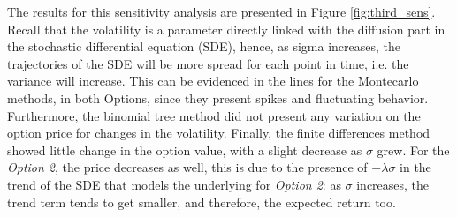 \documentclass[11pt]{article}
\theoremstyle{definition}
\theoremstyle{remark}
\theoremstyle{remark}
\begin{document}
The results for this sensitivity analysis are presented in Figure
\ref{fig:third_sens}. Recall that the volatility is a parameter directly linked
with the diffusion part in the stochastic differential equation (SDE), hence, as
sigma increases, the trajectories of the SDE will be more spread for each point
in time, i.e. the variance will increase. This can be evidenced in the lines for
the Montecarlo methods, in both Options, since they present spikes and
fluctuating behavior. Furthermore, the binomial tree method did not present any
variation on the option price for changes in the volatility. Finally, the finite
differences method showed little change in the option value, with a slight
decrease as $\sigma$ grew. For the \textit{Option 2}, the price decreases as
well, this is due to the presence of $-\lambda\sigma$ in the trend of the SDE
that models the underlying for \textit{Option 2}: as $\sigma$ increases, the
trend term tends to get smaller, and therefore, the expected return too.
\end{document}
